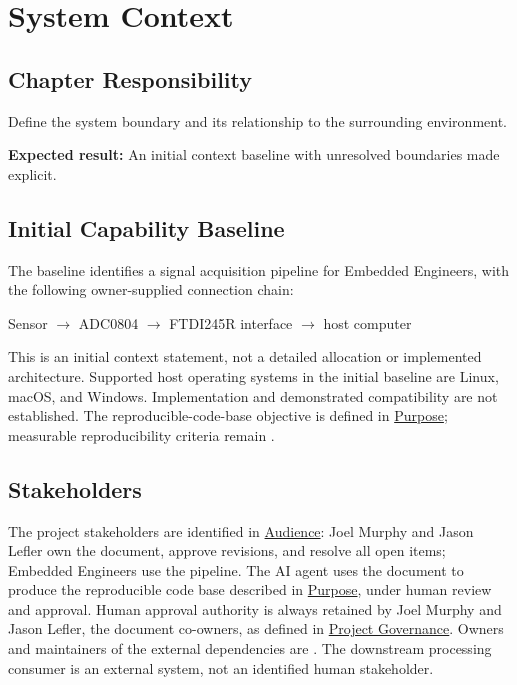 \chapter{System Context}
\section{Chapter Responsibility}
\label{Section:SystemContextResponsibility}
Define the system boundary and its relationship to the surrounding environment.

\noindent\textbf{Expected result:} An initial context baseline with unresolved boundaries made explicit.

\section{Initial Capability Baseline}
\label{Section:InitialCapabilityBaseline}
The baseline identifies a signal acquisition pipeline for Embedded Engineers,
with the following owner-supplied connection chain:

\begin{center}
Sensor $\rightarrow$ ADC0804 $\rightarrow$ FTDI245R interface
$\rightarrow$ host computer
\end{center}

This is an initial context statement, not a detailed allocation or implemented
architecture. Supported host operating systems in the initial baseline are
Linux, macOS, and Windows. Implementation and demonstrated compatibility are
not established. The reproducible-code-base objective is defined in
\hyperref[Section:ProjectPurpose]{Purpose}; measurable reproducibility criteria
remain \OwnedTBD{}.

\section{Stakeholders}
\label{Section:ContextStakeholders}
The project stakeholders are identified in
\hyperref[Section:ProjectStakeholders]{Audience}: Joel Murphy and Jason Lefler own the
document, approve revisions, and resolve all open \OwnedTBD{} items; Embedded
Engineers use the pipeline. The AI agent uses the document to produce the
reproducible code base described in \hyperref[Section:ProjectPurpose]{Purpose},
under human review and approval. Human approval authority is always retained
by Joel Murphy and Jason Lefler, the document co-owners, as defined in
\hyperref[Section:ProjectGovernance]{Project Governance}. Owners and
maintainers of the external dependencies are \OwnedTBD{}. The downstream processing
consumer is an external system, not an identified human stakeholder.

